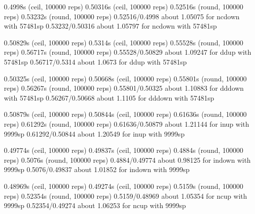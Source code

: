0.4998s (ceil, 100000 reps)                                0.50316s (ceil, 100000 reps)                              
0.52516s (round, 100000 reps)                              0.53232s (round, 100000 reps)                             
0.52516/0.4998 about 1.05075 for ncdown with 57481sp       0.53232/0.50316 about 1.05797 for ncdown with 57481sp     
                                                                                                                     
0.50829s (ceil, 100000 reps)                               0.5314s (ceil, 100000 reps)                               
0.55528s (round, 100000 reps)                              0.56717s (round, 100000 reps)                             
0.55528/0.50829 about 1.09247 for ddup with 57481sp        0.56717/0.5314 about 1.0673 for ddup with 57481sp         
                                                                                                                     
0.50325s (ceil, 100000 reps)                               0.50668s (ceil, 100000 reps)                              
0.55801s (round, 100000 reps)                              0.56267s (round, 100000 reps)                             
0.55801/0.50325 about 1.10883 for dddown with 57481sp      0.56267/0.50668 about 1.1105 for dddown with 57481sp      
                                                                                                                     
0.50879s (ceil, 100000 reps)                               0.50844s (ceil, 100000 reps)                              
0.61636s (round, 100000 reps)                              0.61292s (round, 100000 reps)                             
0.61636/0.50879 about 1.21144 for inup with 9999sp         0.61292/0.50844 about 1.20549 for inup with 9999sp        
                                                                                                                     
0.49774s (ceil, 100000 reps)                               0.49837s (ceil, 100000 reps)                              
0.4884s (round, 100000 reps)                               0.5076s (round, 100000 reps)                              
0.4884/0.49774 about 0.98125 for indown with 9999sp        0.5076/0.49837 about 1.01852 for indown with 9999sp       
                                                                                                                     
0.48969s (ceil, 100000 reps)                               0.49274s (ceil, 100000 reps)                              
0.5159s (round, 100000 reps)                               0.52354s (round, 100000 reps)                             
0.5159/0.48969 about 1.05354 for ncup with 9999sp          0.52354/0.49274 about 1.06253 for ncup with 9999sp        
                                                                                                                     
